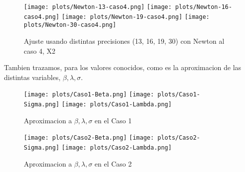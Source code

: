 \begin{figure} [H]

\texttt{[image: plots/Newton-13-caso4.png]}
\texttt{[image: plots/Newton-16-caso4.png]}
\texttt{[image: plots/Newton-19-caso4.png]}
\texttt{[image: plots/Newton-30-caso4.png]}

\caption{Ajuste usando distintas precisiones (13, 16, 19, 30) con Newton al caso 4, X2}
\label{fig:FitCaso4Newton}
\end{figure}


Tambien trazamos, para los valores conocidos, como es la aproximacion de las distintas variables, $\beta, \lambda, \sigma$.

\begin{figure} [H]

\texttt{[image: plots/Caso1-Beta.png]}
\texttt{[image: plots/Caso1-Sigma.png]}
\texttt{[image: plots/Caso1-Lambda.png]}

\caption{Aproximacion a $\beta, \lambda, \sigma$ en el Caso 1}
\label{fig:AproxCaso1}
\end{figure}

\begin{figure} [H]

\texttt{[image: plots/Caso2-Beta.png]}
\texttt{[image: plots/Caso2-Sigma.png]}
\texttt{[image: plots/Caso2-Lambda.png]}

\caption{Aproximacion a $\beta, \lambda, \sigma$ en el Caso 2}
\label{fig:AproxCaso1}
\end{figure}

